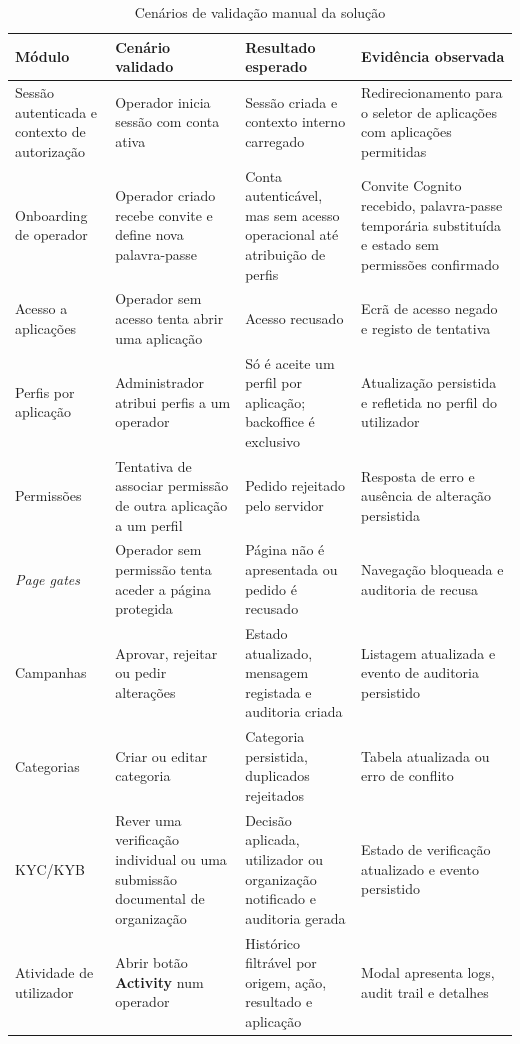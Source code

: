 \begin{table}[H]
\caption{Cenários de validação manual da solução}
\label{tab:validacao_manual}
\begin{center}
\begingroup
\scriptsize
\setlength{\tabcolsep}{4pt}
\begin{tabular}{|>{\raggedright\arraybackslash}p{2.4cm}|>{\raggedright\arraybackslash}p{3.5cm}|>{\raggedright\arraybackslash}p{3.5cm}|>{\raggedright\arraybackslash}p{2.8cm}|}
\hline
\textbf{Módulo} & \textbf{Cenário validado} & \textbf{Resultado esperado} & \textbf{Evidência observada} \\ \hline
Sessão autenticada e contexto de autorização & Operador inicia sessão com conta ativa & Sessão criada e contexto interno carregado & Redirecionamento para o seletor de aplicações com aplicações permitidas \\ \hline
Onboarding de operador & Operador criado recebe convite e define nova palavra-passe & Conta autenticável, mas sem acesso operacional até atribuição de perfis & Convite Cognito recebido, palavra-passe temporária substituída e estado sem permissões confirmado \\ \hline
Acesso a aplicações & Operador sem acesso tenta abrir uma aplicação & Acesso recusado & Ecrã de acesso negado e registo de tentativa \\ \hline
Perfis por aplicação & Administrador atribui perfis a um operador & Só é aceite um perfil por aplicação; backoffice é exclusivo & Atualização persistida e refletida no perfil do utilizador \\ \hline
Permissões & Tentativa de associar permissão de outra aplicação a um perfil & Pedido rejeitado pelo servidor & Resposta de erro e ausência de alteração persistida \\ \hline
\textit{Page gates} & Operador sem permissão tenta aceder a página protegida & Página não é apresentada ou pedido é recusado & Navegação bloqueada e auditoria de recusa \\ \hline
Campanhas & Aprovar, rejeitar ou pedir alterações & Estado atualizado, mensagem registada e auditoria criada & Listagem atualizada e evento de auditoria persistido \\ \hline
Categorias & Criar ou editar categoria & Categoria persistida, duplicados rejeitados & Tabela atualizada ou erro de conflito \\ \hline
KYC/KYB & Rever uma verificação individual ou uma submissão documental de organização & Decisão aplicada, utilizador ou organização notificado e auditoria gerada & Estado de verificação atualizado e evento persistido \\ \hline
Atividade de utilizador & Abrir botão \textbf{Activity} num operador & Histórico filtrável por origem, ação, resultado e aplicação & Modal apresenta logs, audit trail e detalhes \\ \hline
\end{tabular}
\endgroup
\end{center}
\end{table}

